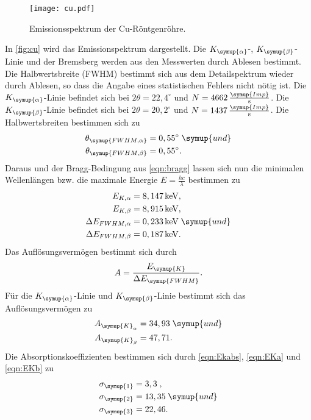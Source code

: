 \begin{figure}
  \centering
  \texttt{[image: cu.pdf]}
  \caption{Emissionsspektrum der Cu-Röntgenröhre.}
  \label{fig:cu}
\end{figure}
In \autoref{fig:cu} wird das Emissionspektrum dargestellt. Die $K_{\symup{\alpha}}$-, $K_{\symup{\beta}}$-Linie und
der Bremsberg werden aus den Messwerten durch Ablesen bestimmt. Die Halbwertsbreite (FWHM) bestimmt sich aus dem
Detailspektrum wieder durch Ablesen, so dass die Angabe eines statistischen Fehlers nicht nötig ist.
Die $K_{\symup{\alpha}}$-Linie befindet sich bei $2\theta=22,4^{\circ}$ und 
$N = 4662\,\frac{\symup{Imp}}{\unit{\second}}$. Die $K_{\symup{\beta}}$-Linie befindet sich bei 
$2\theta=20,2^{\circ}$ und $N = 1437\,\frac{\symup{Imp}}{\unit{\second}}$. Die Halbwertsbreiten bestimmen sich zu
\begin{align*}
  \theta_{\symup{FWHM, \alpha}} &= 0,55^{\circ} \; \symup{und} \\
  \theta_{\symup{FWHM, \beta}} &= 0,55^{\circ}. 
\end{align*}
Daraus und der Bragg-Bedingung aus \autoref{eqn:bragg} lassen sich nun die minimalen Wellenlängen bzw.
die maximale Energie $E = \frac{hc}{\lambda}$ bestimmen zu
\begin{align*}
  E_{K,\alpha}           &= 8,147\,\unit{\kilo\eV},\\
  E_{K, \beta}           &= 8,915\,\unit{\kilo\eV},\\
  \Delta E_{FWHM,\alpha} &= 0,233\,\unit{\kilo\eV} \; \symup{und}\\
  \Delta E_{FWHM,\beta}  &= 0,187\,\unit{\kilo\eV}.
\end{align*}
Das Auflösungsvermögen bestimmt sich durch
\begin{align*}
  A = \frac{E_{\symup{K}}}{\Delta E_{\symup{FWHM}}}.
\end{align*}
Für die $K_{\symup{\alpha}}$-Linie und $K_{\symup{\beta}}$-Linie bestimmt sich das Auflösungsvermögen zu
\begin{align*}
  A_{\symup{K}_{\alpha}}  &=  34,93 \; \symup{und}\\
  A_{\symup{K}_{\beta}}   &= 47,71.
\end{align*}
Die Absorptionskoeffizienten bestimmen sich durch \autoref{eqn:Ekabs}, \autoref{eqn:EKa} und
\autoref{eqn:EKb} zu
\begin{align*}
  \sigma_{\symup{1}} &= 3,3\;,\\
  \sigma_{\symup{2}} &= 13,35\; \symup{und}\\
  \sigma_{\symup{3}} &= 22,46.
\end{align*}